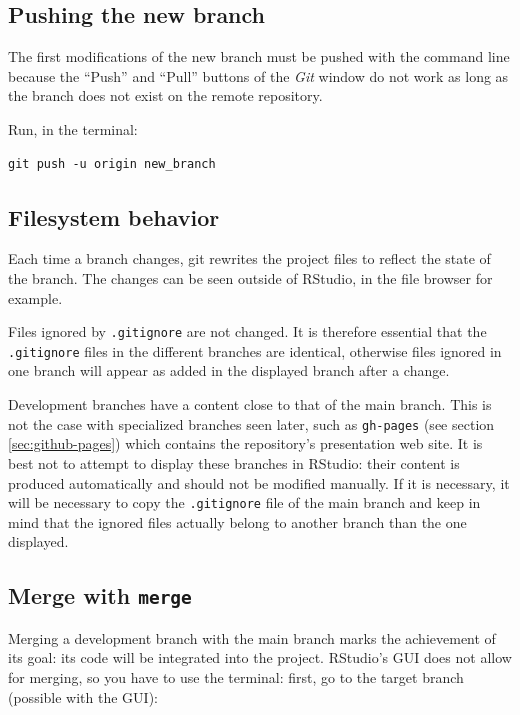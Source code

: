 \documentclass[
  12pt,
  american,
  a4paper,
  extrafontsizes,onecolumn,openright
  ]{memoir}
\begin{document}
\hypertarget{pushing-the-new-branch}{%
\subsection{Pushing the new branch}\label{pushing-the-new-branch}}

The first modifications of the new branch must be pushed with the command line because the \enquote{Push} and \enquote{Pull} buttons of the \emph{Git} window do not work as long as the branch does not exist on the remote repository.

Run, in the terminal:

\begin{verbatim}
git push -u origin new_branch
\end{verbatim}

\hypertarget{filesystem-behavior}{%
\subsection{Filesystem behavior}\label{filesystem-behavior}}

Each time a branch changes, git rewrites the project files to reflect the state of the branch.
The changes can be seen outside of RStudio, in the file browser for example.

Files ignored by \texttt{.gitignore} are not changed.
It is therefore essential that the \texttt{.gitignore} files in the different branches are identical, otherwise files ignored in one branch will appear as added in the displayed branch after a change.

Development branches have a content close to that of the main branch.
This is not the case with specialized branches seen later, such as \texttt{gh-pages} (see section \ref{sec:github-pages}) which contains the repository's presentation web site.
It is best not to attempt to display these branches in RStudio: their content is produced automatically and should not be modified manually.
If it is necessary, it will be necessary to copy the \texttt{.gitignore} file of the main branch and keep in mind that the ignored files actually belong to another branch than the one displayed.

\hypertarget{merge-with-merge}{%
\subsection{\texorpdfstring{Merge with \texttt{merge}}{Merge with merge}}\label{merge-with-merge}}

Merging a development branch with the main branch marks the achievement of its goal: its code will be integrated into the project.
RStudio's GUI does not allow for merging, so you have to use the terminal: first, go to the target branch (possible with the GUI):
\end{document}
